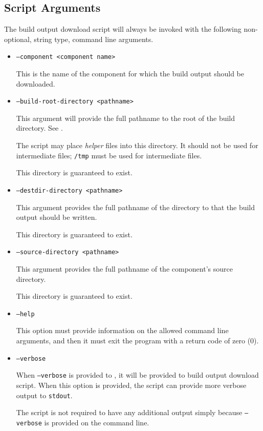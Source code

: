 \subsection{Script Arguments}

The build output download script will always be invoked with the
following non-optional, string type, command line arguments.

\begin{itemize}
\item{\texttt{--component <component name>}}

  This is the name of the component for which the build output should
  be downloaded.

\item{\texttt{--build-root-directory <pathname>}}

  This argument will provide the full pathname to the root of the
  build directory.  See .

  The script may place \emph{helper} files into this directory.  It
  should not be used for intermediate files; \texttt{/tmp} must be used
  for intermediate files.

  This directory is guaranteed to exist.

\item{\texttt{--destdir-directory <pathname>}}

  This argument provides the full pathname of the directory to that
  the build output should be written.

  This directory is guaranteed to exist.

\item{\texttt{--source-directory <pathname>}}

  This argument provides the full pathname of the component's source
  directory.

  This directory is guaranteed to exist.

\item{\texttt{--help}}

  This option must provide information on the allowed command line
  arguments, and then it must exit the program with a return code of
  zero (0).

\item{\texttt{--verbose}}

  When \texttt{--verbose} is provided to \lmsbwcmd, it will be
  provided to build output download script.  When this option is
  provided, the script can provide more verbose output to
  \texttt{stdout}.

  The script is not required to have any additional output simply
  because \texttt{--verbose} is provided on the command line.
\end{itemize}

